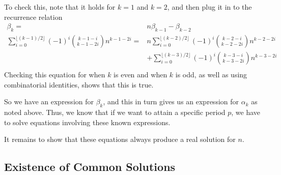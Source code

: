 \documentclass[12pt]{article}
\begin{document}
To check this, note that it holds for $k = 1$ and $k = 2$, and then plug it in to the recurrence relation
\begin{align*}
\beta_k =& n\beta_{k-1} - \beta_{k-2}\\
\sum_{i = 0}^{\lfloor (k-1)/2 \rfloor} (-1)^i\binom{k-1-i}{k-1-2i}n^{k-1-2i} = & n \sum_{i = 0}^{\lfloor (k-2)/2 \rfloor} (-1)^i\binom{k-2-i}{k-2-2i}n^{k-2-2i} \\
& +\sum_{i = 0}^{\lfloor (k-3)/2 \rfloor} (-1)^i\binom{k-3-i}{k-3-2i}n^{k-3-2i}\\
\end{align*}
Checking this equation for when $k$ is even and when $k$ is odd, as well as using combinatorial identities, shows that this is true.

So we have an expression for $\beta_k$, and this in turn gives us an expression for $\alpha_k$ as noted above. Thus, we know that if we want to attain a specific period $p$, we have to solve equations involving these known expressions.

It remains to show that these equations always produce a real solution for $n$.

\subsection{Existence of Common Solutions}
\end{document}
